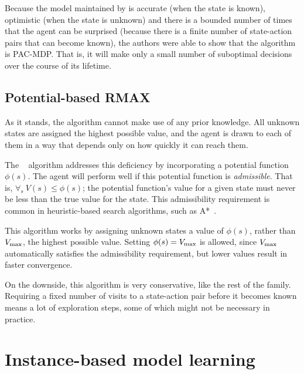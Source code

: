 Because the model maintained by  is accurate (when the state is known), optimistic (when the state is unknown) and there is a bounded number of times that the agent can be surprised (because there is a finite number of state-action pairs that can become known), the authors were able to show that the algorithm is PAC-MDP. That is, it will make only a small number of suboptimal decisions over the course of its lifetime.

\subsection{Potential-based RMAX}


As it stands, the  algorithm cannot make use of any prior knowledge. All unknown states are assigned the highest possible value, and the agent is drawn to each of them in a way that depends only on how quickly it can reach them.

The ~\cite{asmuth08} algorithm addresses this deficiency by incorporating a potential function $\phi(s)$. The agent will perform well if this potential function is \emph{admissible}. That is, $\forall_s ~ V(s) \leq \phi(s)$; the potential function's value for a given state must never be less than the true value for the state. This admissibility requirement is common in heuristic-based search algorithms, such as A*~\cite{russell1995artificial}.

This algorithm works by assigning unknown states a value of $\phi(s)$, rather than $V_{\rm max}$, the highest possible value. Setting $\phi(s)=V_{\rm max}$ is allowed, since $V_{\rm max}$ automatically satisfies the admissibility requirement, but lower values result in faster convergence.

On the downside, this algorithm is very conservative, like the rest of the  family. Requiring a fixed number of visits to a state-action pair before it becomes known means a lot of exploration steps, some of which might not be necessary in practice.




\section{Instance-based model learning}

